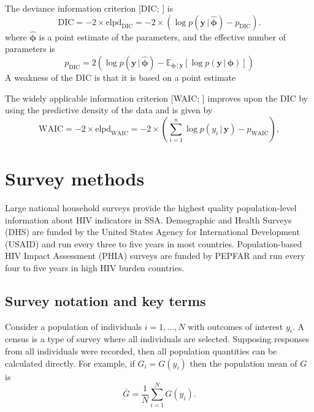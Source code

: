 \documentclass[a4paper, nobind]{templates/ociamthesis}
\begin{document}
The deviance information criterion {[}DIC; \textcite{spiegelhalter2002bayesian}{]} is
\[
\begin{equation}
  \text{DIC} = -2 \times \text{elpd}_\text{DIC} = -2 \times \left( \log p(\mathbf{y} \, | \, \hat{\boldsymbol{\mathbf{\phi}}}) - p_{\text{DIC}} \right).
\end{equation}
\]
where \(\hat{\boldsymbol{\mathbf{\phi}}}\) is a point estimate of the parameters, and the effective number of parameters is
\[
p_\text{DIC} = 2 \left( \log p(\mathbf{y} \, | \,\hat{\boldsymbol{\mathbf{\phi}}}) - \mathbb{E}_{{\boldsymbol{\mathbf{\phi}}} \, | \, \mathbf{y}}[\log p(\mathbf{y} \, | \, \boldsymbol{\mathbf{\phi}})] \right)
\]
A weakness of the DIC is that it is based on a point estimate \autocite{spiegelhalter2014deviance,gelman2014understanding}

The widely applicable information criterion {[}WAIC; \textcite{watanabe2013widely}{]} improves upon the DIC by using the predictive density of the data and is given by
\[
\begin{equation}
\text{WAIC} = -2 \times \text{elpd}_\text{WAIC} = -2 \times \left( \sum_{i = 1}^n \log p(y_i \, | \, \mathbf{y}) - p_\text{WAIC} \right),
\end{equation}
\]

\hypertarget{survey}{%
\section{Survey methods}\label{survey}}

Large national household surveys provide the highest quality population-level information about HIV indicators in SSA.
Demographic and Health Surveys (DHS) are funded by the United States Agency for International Development (USAID) and run every three to five years in most countries.
Population-based HIV Impact Assessment (PHIA) surveys are funded by PEPFAR and run every four to five years in high HIV burden countries.

\hypertarget{survey-notation-and-key-terms}{%
\subsection{Survey notation and key terms}\label{survey-notation-and-key-terms}}

Consider a population of individuals \(i = 1, \ldots, N\) with outcomes of interest \(y_i\).
A census is a type of survey where all individuals are selected.
Supposing responses from all individuals were recorded, then all population quantities can be calculated directly.
For example, if \(G_i = G(y_i)\) then the population mean of \(G\) is
\begin{equation}
\bar G = \frac{1}{N} \sum_{i = 1}^N G(y_i).
\end{equation}
\end{document}
